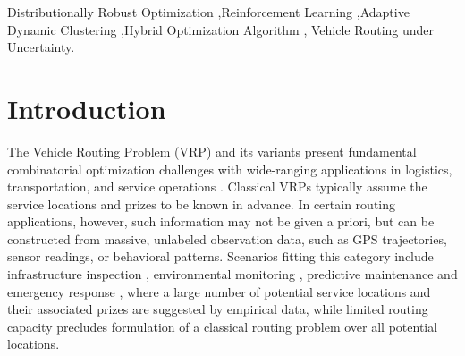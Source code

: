 \documentclass[preprint,12pt,authoryear]{elsarticle}
\theoremstyle{definition}
\begin{document}
\begin{frontmatter}


\begin{keyword}
Distributionally Robust Optimization \sep Reinforcement Learning \sep Adaptive Dynamic Clustering \sep Hybrid Optimization Algorithm \sep
Vehicle Routing under Uncertainty.


\end{keyword}

\end{frontmatter}

\section{Introduction}\label{sec:Intro}


The Vehicle Routing Problem (VRP) and its variants present fundamental combinatorial optimization challenges with wide-ranging applications in logistics, transportation, and service operations \citep{eksioglu2009vehicle, konstantakopoulos2022vehicle,zhang2021robust}. Classical VRPs  typically assume the service locations and prizes to be known in advance. In certain routing applications, however, such information may not be given a priori, but can be constructed from massive, unlabeled observation data, such as GPS trajectories, sensor readings, or behavioral patterns. Scenarios fitting this category include infrastructure inspection \citep{pan2024unmanned}, environmental monitoring \citep{cirovic2014green}, predictive maintenance \citep{gerum2019data} and emergency response \citep{zografos2008decision}, where a large number of potential service locations and their associated prizes are suggested by empirical data, while limited routing capacity precludes formulation of a classical routing problem over all potential locations. 
\end{document}
